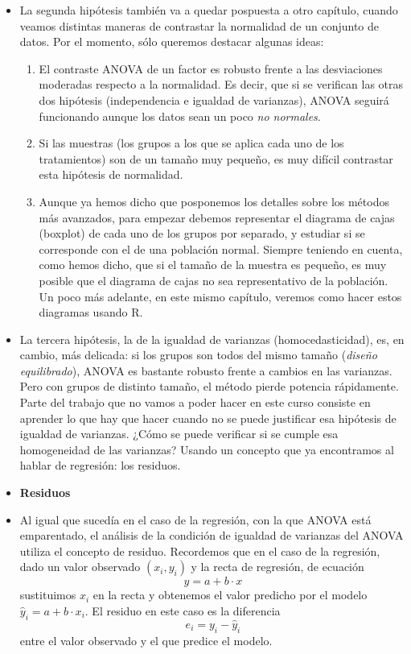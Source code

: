 \begin{itemize}
    \item La segunda hipótesis también va a quedar pospuesta a otro capítulo, cuando veamos distintas maneras de contrastar la normalidad de un conjunto de datos. Por el momento, sólo queremos destacar algunas ideas:
        \begin{enumerate}
                \item El contraste ANOVA de un factor es robusto frente a las desviaciones moderadas respecto a la normalidad. Es decir, que si se verifican las otras dos hipótesis (independencia e igualdad de varianzas), ANOVA seguirá funcionando aunque los datos sean un poco {\em no normales}.
                \item Si las muestras (los grupos a los que se aplica cada uno de los tratamientos) son de un tamaño muy pequeño, es muy difícil contrastar esta hipótesis de normalidad.
                \item Aunque ya hemos dicho que posponemos los detalles sobre los métodos más avanzados, para empezar debemos representar el diagrama de cajas (boxplot) de cada uno de los grupos por separado, y estudiar si se corresponde con el de una población normal. Siempre teniendo en cuenta, como hemos dicho, que si el tamaño de la muestra es pequeño, es muy posible que el diagrama de cajas no sea representativo de la población. Un poco más adelante, en este mismo capítulo, veremos como hacer estos diagramas usando R.
        \end{enumerate}

    \item La tercera hipótesis, la de la igualdad de varianzas (homocedasticidad), es, en cambio, más delicada: si los grupos son todos del mismo tamaño ({\em diseño equilibrado}), ANOVA es bastante robusto frente a cambios en las varianzas. Pero con grupos de distinto tamaño, el método pierde potencia rápidamente. Parte del trabajo que no vamos a poder hacer en este curso consiste en aprender lo que hay que hacer cuando no se puede justificar esa hipótesis de igualdad de varianzas. ¿Cómo se puede verificar si se cumple esa homogeneidad de las varianzas? Usando un concepto que ya encontramos al hablar de regresión: los residuos.

    \item[]{\bf Residuos}

    \item Al igual que sucedía en el caso de la regresión, con la que ANOVA está emparentado, el análisis de la condición de igualdad de varianzas del ANOVA utiliza el concepto de {\sf residuo}. Recordemos que en el caso de la regresión, dado un valor observado $(x_i,y_i)$ y la recta de regresión, de ecuación
        \[y=a+b\cdot x\]
        sustituimos $x_i$ en la recta y obtenemos el valor predicho por el modelo $\hat y_i=a+b\cdot x_i$. El residuo en este caso es la diferencia
        \[e_i=y_i-\hat y_i\]
        entre el valor observado y el que predice el modelo.


\end{itemize}
